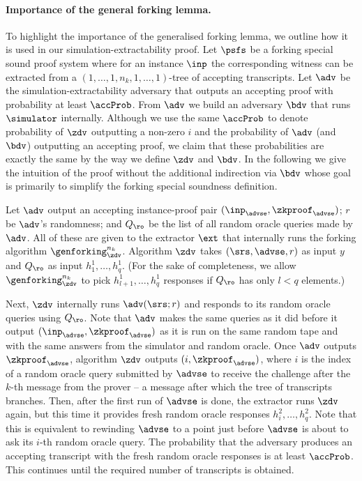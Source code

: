 \paragraph{Importance of the general forking lemma.}
To highlight the importance of the generalised forking lemma, we outline how it is
used in our simulation-extractability proof.  Let $\psfs$ be a forking special sound
proof system where for an instance $\inp$ the corresponding witness can be extracted
from a $(1, \ldots, 1, n_k, 1, \ldots, 1)$-tree of accepting transcripts.  Let $\adv$
be the simulation-extractability adversary that outputs an accepting proof with
probability at least $\accProb$. From $\adv$ we build an adversary $\bdv$ that runs
$\simulator$ internally. Although we use the same $\accProb$ to denote probability of
$\zdv$ outputting a non-zero $i$ and the probability of $\adv$ (and $\bdv$)
outputting an accepting proof, we claim that these probabilities are exactly the same
by the way we define $\zdv$ and $\bdv$. In the following we give the intuition of the
proof without the additional indirection via $\bdv$ whose goal is primarily to
simplify the forking special soundness definition.

Let $\adv$ output an accepting instance-proof pair $(\inp_{\advse},\zkproof_{\advse})$;
$r$ be $\adv$'s randomness; and $Q_\ro$ be the list of all random oracle queries made by
$\adv$.  All of these are given to the extractor $\ext$ that internally runs the forking
algorithm $\genforking_\zdv^{n_k}$.  Algorithm $\zdv$ takes
$(\srs, \advse, r)$ as input $y$ and $Q_\ro$ as input $h_1^1, \ldots, h_q^1$.
(For the sake of completeness, we allow $\genforking_\zdv^{n_k}$ to pick
$h^1_{l + 1}, \ldots, h^1_q$ responses if $Q_\ro$ has only $l < q$ elements.)

Next, $\zdv$ internally runs $\adv(\srs; r)$ %
and responds to its random oracle queries using $Q_\ro$. Note that $\adv$ makes the same
queries as it did before it output $(\inp_{\advse}, \zkproof_{\advse})$ as it is run on
the same random tape and with the same answers from the simulator and random oracle. Once
$\adv$ outputs $\zkproof_{\advse}$, algorithm $\zdv$ outputs $(i, \zkproof_{\advse})$,
where $i$ is the index of a random oracle query submitted by $\advse$ to receive the
challenge after the $k$-th message from the prover -- a message after which the tree of
transcripts branches.  Then, after the first run of $\advse$ is done, the extractor runs
$\zdv$ again, but this time it provides fresh random oracle responses
$h^2_i, \ldots, h^2_q$. Note that this is equivalent to rewinding $\advse$ to a point just
before $\advse$ is about to ask its $i$-th random oracle query. The probability that the
adversary produces an accepting transcript with the fresh random oracle responses is at
least $\accProb$. This continues until the required number of transcripts is obtained.


